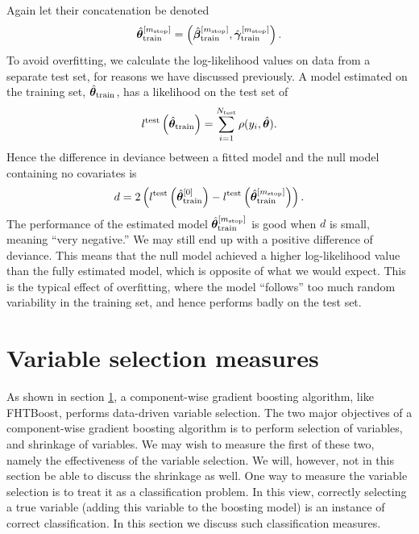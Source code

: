 Again let their concatenation be denoted
\begin{equation*}
    \hat{\boldsymbol{\theta}}^{[m_{\text{stop}}]}_{\text{train}}=\left(\hat{\boldsymbol{\beta}}^{[m_{\text{stop}}]}_{\text{train}},\hat{\boldsymbol{\gamma}}^{[m_{\text{stop}}]}_{\text{train}}\right).
\end{equation*}
To avoid overfitting, we calculate the log-likelihood values on data from a separate test set, for reasons we have discussed previously.
A model estimated on the training set, $\hat{\boldsymbol{\theta}}_{\text{train}}$, has a likelihood on the test set of
\begin{equation}
    l^{\text{test}}\left(\hat{\boldsymbol{\theta}}_{\text{train}}\right)=\sum_{i=1}^{N_{\text{test}}}\rho(y_i, \hat{\boldsymbol{\theta}}).
\end{equation}
Hence the difference in deviance between a fitted model and the null model containing no covariates is
\begin{equation*}
    d=2\left(l^{\text{test}}\left(\hat{\boldsymbol{\theta}}^{[0]}_{\text{train}}\right)-l^{\text{test}}\left(\hat{\boldsymbol{\theta}}^{[m_{\text{stop}}]}_{\text{train}}\right)\right).
\end{equation*}
The performance of the estimated model $\hat{\boldsymbol{\theta}}^{[m_{\text{stop}}]}_{\text{train}}$ is good when $d$ is small, meaning ``very negative.''
We may still end up with a positive difference of deviance.
This means that the null model achieved a higher log-likelihood value than the fully estimated model, which is opposite of what we would expect.
This is the typical effect of overfitting, where the model ``follows'' too much random variability in the training set, and hence performs badly on the test set.


\section{Variable selection measures}
\label{sec:variable-selection}
As shown in section \ref{sec:variable-selection}, a component-wise gradient boosting algorithm, like FHTBoost, performs data-driven variable selection.
The two major objectives of a component-wise gradient boosting algorithm is to perform selection of variables, and shrinkage of variables.
We may wish to measure the first of these two, namely the effectiveness of the variable selection.
We will, however, not in this section be able to discuss the shrinkage as well.
One way to measure the variable selection is to treat it as a classification problem.
In this view, correctly selecting a true variable (adding this variable to the boosting model) is an instance of correct classification.
In this section we discuss such classification measures.

